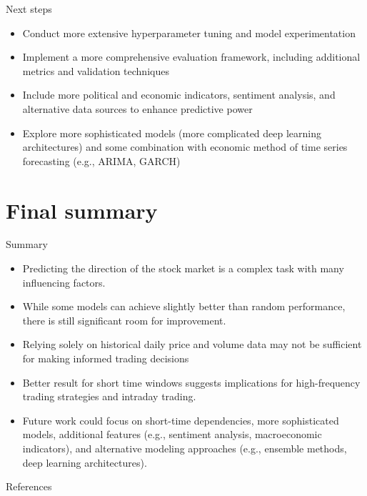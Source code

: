 \documentclass[aspectratio=43]{beamer} %
\begin{document}
\begin{frame}{Next steps}
\begin{itemize}
  \item Conduct more extensive hyperparameter tuning and model experimentation
  \item Implement a more comprehensive evaluation framework, including additional metrics and validation techniques
  \item Include more political and economic indicators, sentiment analysis, and alternative data sources to enhance predictive power
  \item Explore more sophisticated models (more complicated deep learning architectures) and some combination with economic method of time series forecasting (e.g., ARIMA, GARCH)
\end{itemize}
\end{frame}

\section{Final summary}
\begin{frame}{Summary}
\begin{itemize}
  \item Predicting the direction of the stock market is a complex task with many influencing factors. 
  \item While some models can achieve slightly better than random performance, there is still significant room for improvement. 
  \item Relying solely on historical daily price and volume data may not be sufficient for making informed trading decisions
  \item Better result for short time windows suggests implications for high-frequency trading strategies and intraday trading.
  \item Future work could focus on short-time dependencies, more sophisticated models, additional features (e.g., sentiment analysis, macroeconomic indicators), and alternative modeling approaches (e.g., ensemble methods, deep learning architectures).
  \end{itemize}
\end{frame}



\begin{frame}{References}
%
%
\end{frame}
\end{document}
